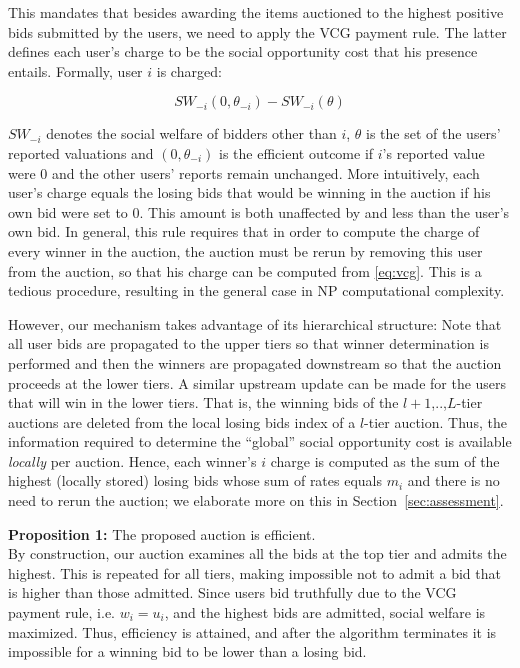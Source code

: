 \documentclass[a4paper]{article}
\begin{document}
This mandates that besides awarding the items auctioned to the highest positive bids
submitted by the users, we need to apply the VCG payment rule. The
latter defines each user's charge to be the social opportunity cost that his 
presence entails. Formally, user $i$ is charged:

\begin{equation}
\label{eq:vcg}
SW_{-i}(0, \theta_{-i}) - SW_{-i}(\theta)
\end{equation}

$SW_{-i}$ denotes the social welfare of bidders other than $i$, $\theta$ is the set of the
users' reported valuations and $(0, \theta_{-i})$ is the efficient outcome
if $i$'s reported value were $0$ and the other users' reports remain
unchanged. More intuitively, each user's charge equals the
losing bids that would be winning in the auction if his own bid were set to 0. 
This amount is both unaffected by and less than the user's own bid.
In general, this rule requires that in order to compute the charge of every winner
in the auction, the auction must  be rerun by removing this user from the auction,
so that his charge can be computed from \ref{eq:vcg}. This is a tedious procedure,
resulting in the general case in NP computational complexity. 

However, our mechanism takes advantage of its hierarchical structure:  
Note that all user bids are propagated to the upper tiers so that
winner determination is performed and then the winners are propagated downstream
so that the auction proceeds at the lower tiers. A similar upstream update
can be made for the users that will win in the lower tiers. That is, 
the winning bids of the  $l+1$,..,$L$-tier auctions are deleted from
the local losing bids index of a $l$-tier auction. Thus, the information 
required to determine the 
``global'' social opportunity cost is available {\em locally} per auction.
Hence, each winner's $i$ charge is computed as the sum of the highest (locally
stored) losing bids whose sum of rates equals $m_i$ and 
there is no need to rerun the auction; we elaborate more on this
in Section~\ref{sec:assessment}.

{\bf Proposition 1:} The proposed auction is efficient.
\\
By construction, our auction examines all the bids
at the top tier and admits the highest. This is repeated for all tiers,
making impossible not to admit a bid that is higher than those admitted. 
Since users bid truthfully due to the VCG payment rule, i.e. $w_i = u_i$,
and the highest bids are admitted, social welfare is maximized. Thus, 
efficiency is attained,  and after the algorithm terminates it is impossible for
a winning bid to be lower than a losing bid.
\\ 
\end{document}
